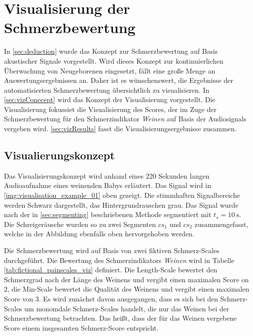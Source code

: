 \chapter{Visualisierung der Schmerzbewertung}
\label{sec:visualisation}

In \autoref{sec:deduction} wurde das Konzept zur Schmerzbewertung auf Basis akustischer Signale vorgestellt. Wird dieses Konzept zur kontinuierlichen Überwachung von Neugeborenen eingesetzt, fällt eine große Menge an Auswertungsergebnissen an. Daher ist es wünschenswert, die Ergebnisse der automatisierten Schmerzbewertung übersichtlich zu visualisieren. In \autoref{sec:vizConecept} wird das Konzept der Visualisierung vorgestellt. Die Visualisierung fokussiet die Visualisierung des Scores, der im Zuge der Schmerzbewertung für den Schmerzindikator \emph{Weinen} auf Basis der Audiosignals vergeben wird. \autoref{sec:vizResults} fasst die Visualisierungsergebnisse zusammen.

\section{Visualierungskonzept}
\label{sec:vizConecept}

Das Visualisierungskonzept wird anhand eines 220 Sekunden langen Audioaufnahme eines weinenden Babys erläutert. Das Signal wird in \autoref{img:visualisation_example_01} oben gezeigt. Die stimmhaften Signalbereiche werden Schwarz dargestellt, das Hintergrundrauschen grau. Das Signal wurde nach der in \autoref{sec:segmenting} beschriebenen Methode segmentiert mit $t_{s} = \SI{10}{\second}$. Die Schreigeräusche wurden so zu zwei Segmenten $cs_1$ und $cs_2$ zusammengefasst, welche in der Abbildung ebenfalls oben hervorgehoben werden.

Die Schmerzbewertung wird auf Basis von zwei fiktiven Schmerz-Scales durchgeführt. Die Bewertung des Schmerzindikators \emph{Weinen} wird in Tabelle \ref{tab:fictional_painscales_viz} definiert. Die \glqq Length-Scale\grqq{} bewertet den Schmerzgrad nach der Länge des Weinens und vergibt einen maximalen Score on 2, die \glqq Min-Scale\grqq{} bewertet die Qualität des Weinens und vergibt einen maximalen Score von 3. Es wird zunächst davon ausgegangen, dass es sich bei den Schmerz-Scales um monomdale Schmerz-Scales handelt, die nur das Weinen bei der Schmerzbewertung betrachten. Das heißt, dass der für das Weinen vergebene Score einem insgesamten Schmerz-Score entspricht.

